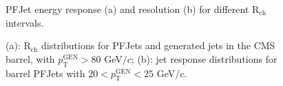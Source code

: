 \documentclass{cmspaper}
\begin{document}
\begin{figure}[tb]
\centering
{}
\caption{PFJet energy response (a) and resolution (b) for different R$_{\mathrm{ch}}$ intervals. \label{fig:Rch_binning}}
\end{figure}

\begin{figure}[tb]
\centering
{}
\caption{(a): R$_{\mathrm{ch}}$ distributions for PFJets and generated jets in the CMS barrel, with $p_{\mathrm{T}}^{\mathrm{GEN}}>80$ GeV$/c$; (b): jet response distributions for barrel PFJets with $20 < p_{\mathrm{T}}^{\mathrm{GEN}} < 25$ GeV$/c$. \label{fig:Rch_distrib}}
\end{figure}
\end{document}
